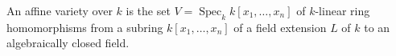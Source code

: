 An affine variety over $k$ is the set $V = \operatorname{Spec}_k k[x_1, \ldots, x_n]$ of $k$-linear ring homomorphisms from a subring $k[x_1, \ldots, x_n]$ of a field extension $L$ of $k$ to an algebraically closed field.
